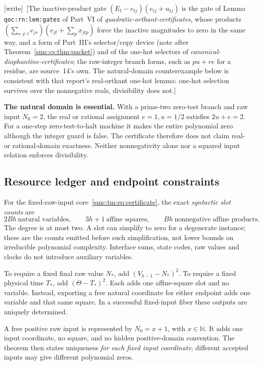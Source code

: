 \documentclass[11pt,letterpaper]{article}
\numberwithin{equation}{section}
\theoremstyle{definition}
\theoremstyle{remark}
\newcommand{\NN}{\mathbb N}
\newcommand{\wtag}{\textup{[write]}}
\begin{document}
\wtag\ [The inactive-product gate $(E_t-e_{tj})(e_{tj}+u_{tj})$ is the gate of Lemma \texttt{qoc:rn:lem:gates} of Part~VI of \emph{quadratic-orthant-certificates}, whose products $(\sum_{s\ne t}e_{js})(e_{jt}+\sum_px_{jtp})$ force the inactive magnitudes to zero in the same way, and a form of Part~III's selector/copy device (note after Theorem~\ref{smc:cs:thm:packet}) and of the one-hot selectors of \emph{canonical-diophantine-certificates}; the raw-integer branch forms, such as $pu+re$ for a residue, are source~14's own. The natural-domain counterexample below is consistent with that report's real-orthant one-hot lemma: one-hot selection survives over the nonnegative reals, divisibility does not.]

\textbf{The natural domain is essential.} With a prime-two zero-test branch and raw input $N_0=2$, the real or rational assignment $e=1,u=1/2$ satisfies $2u+e=2$. For a one-step zero-test-to-halt machine it makes the entire polynomial zero although the integer guard is false. The certificate therefore does not claim real- or rational-domain exactness. Neither nonnegativity alone nor a squared input relation enforces divisibility.

\subsection{Resource ledger and endpoint constraints}

For the fixed-raw-input core~\eqref{smc:tm:eq:certificate}, the exact \emph{syntactic slot counts} are
\[
\boxed{2Bh\ \text{natural variables},\qquad 3h+1\ \text{affine squares},
\qquad Bh\ \text{nonnegative affine products}.}
\]
The degree is at most two. A slot can simplify to zero for a degenerate instance; these are the counts emitted before such simplification, not lower bounds on irreducible polynomial complexity. Interface sums, state codes, raw values and clocks do not introduce auxiliary variables.

To require a fixed final raw value $N_\ast$, add $(V_{h-1}-N_\ast)^2$. To require a fixed physical time $T_\ast$, add $(\Theta-T_\ast)^2$. Each adds one affine-square slot and no variable. Instead, exporting a free natural coordinate for either endpoint adds one variable and that same square. In a successful fixed-input fiber these outputs are uniquely determined.

A free positive raw input is represented by $N_0=x+1$, with $x\in\NN$. It adds one input coordinate, no square, and no hidden positive-domain convention. The theorem then states uniqueness \emph{for each fixed input coordinate}; different accepted inputs may give different polynomial zeros.
\end{document}
